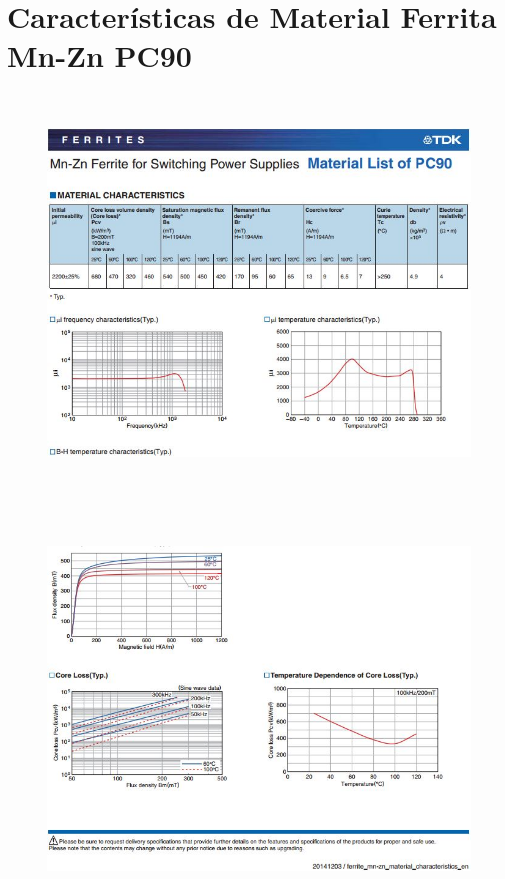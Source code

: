 \chapter{Caracter\'isticas de Material Ferrita Mn-Zn PC90}

\newpage

\begin{figure}[H]
\centering
	\includegraphics[width=\textwidth, height=10.5cm]{images/Anexos/fig4}
\end{figure}
\begin{figure}[H]
\centering
	\includegraphics[width=\textwidth, height=10.5cm]{images/Anexos/fig5}
\end{figure}

